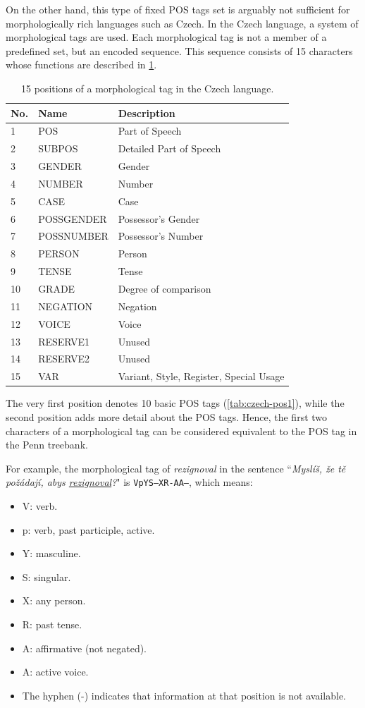 On the other hand, this type of fixed POS tags set is arguably not sufficient for morphologically rich languages such as Czech. In the Czech language, a system of morphological tags are used. Each morphological tag is not a member of a predefined set, but an encoded sequence. This sequence consists of 15 characters whose functions are described in \cref{tab:czech-pos}.

\begin{table}[t]
\centering
\begin{tabular}{| l | l | l |} 
\hline
    No. & Name & Description \\
\hline
     1 & POS & Part of Speech \\
     2 & SUBPOS & Detailed Part of Speech \\
     3 & GENDER & Gender \\
     4 & NUMBER & Number \\
     5 & CASE & Case \\
     6 & POSSGENDER & Possessor's Gender \\
     7 & POSSNUMBER & Possessor's Number \\
     8 & PERSON & Person \\
     9 & TENSE & Tense \\
     10 & GRADE & Degree of comparison \\
     11 & NEGATION & Negation \\
     12 & VOICE & Voice \\
     13 & RESERVE1 & Unused \\
     14 & RESERVE2 & Unused \\
     15 & VAR & Variant, Style, Register, Special Usage  \\
\hline
\end{tabular}
\caption{15 positions of a morphological tag in the Czech language.}
\label{tab:czech-pos}
\end{table}

The very first position denotes 10 basic POS tags (\cref{tab:czech-pos1}), while the second position adds more detail about the POS tags. Hence, the first two characters of a morphological tag can be considered equivalent to the POS tag in the Penn treebank.

For example, the morphological tag of \textit{rezignoval} in the sentence ``\textit{Myslíš, že tě požádají, abys \underline{rezignoval}?}" is \texttt{VpYS---XR-AA---}, which means:
\begin{itemize}
    \item V: verb.
    \item p: verb, past participle, active.
    \item Y: masculine.
    \item S: singular.
    \item X: any person.
    \item R: past tense.
    \item A: affirmative (not negated).
    \item A: active voice.
    \item The hyphen (-) indicates that information at that position is not available.
\end{itemize}


